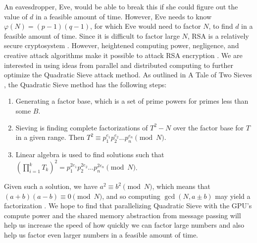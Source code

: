 \documentclass[11pt,twocolumn]{article}
\begin{document}
\indent An eavesdropper, Eve, would be able to break this if she could figure out the value of $d$ in a feasible amount of time. However, Eve needs to know $\varphi(N) = (p-1)(q-1)$, for which Eve would need to factor $N$, to find $d$ in a feasible amount of time. Since it is difficult to factor large $N$, RSA is a relatively secure cryptosystem \cite{hoffstein:cryptography}. However, heightened computing power, negligence, and creative attack algorithms make it possible to attack RSA encryption \cite{lifchitz:rsa_break}. We are interested in using ideas from parallel and distributed computing to further optimize the Quadratic Sieve attack method. As outlined in A Tale of Two Sieves \cite{pomerance:tts}, the Quadratic Sieve method has the following steps:

\begin{enumerate}
    \item Generating a factor base, which is a set of prime powers for primes less than some $B$.
    \item Sieving is finding complete factorizations of $T^2 - N$ over the factor base for $T$ in a given range. Then $T^2 \equiv p_1^{e_1} p_2^{e_2} \ldots p_n^{e_n} \pmod{N}$.
    \item Linear algebra is used to find solutions such that $\left( \displaystyle \prod_{i = 1}^k T_k \right)^2 = p_1^{2e_1} p_2^{2e_2} \ldots p_n^{2e_n} \pmod{N}$.
\end{enumerate}

Given such a solution, we have $a^2 \equiv b^2 \pmod{N} $, which means that $(a+b)(a-b) \equiv 0 \pmod{N}$, and so computing $\gcd(N, a \pm b)$ may yield a factorization \cite{hoffstein:cryptography}. We hope to find that parallelizing Quadratic Sieve with the GPU's compute power and the shared memory abstraction from message passing will help us increase the speed of how quickly we can factor large numbers and also help us factor even larger numbers in a feasible amount of time.
\end{document}
